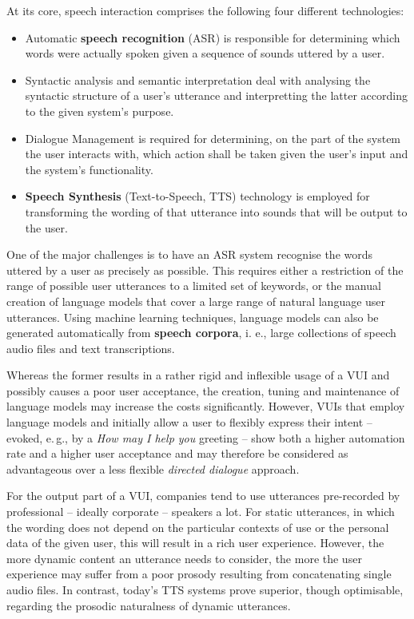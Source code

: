 \begin{multicols}{2}
At its core, speech interaction comprises the following four different technologies:

\begin{itemize}
\item Automatic \textbf{speech recognition} (ASR) is responsible for determining which words were actually spoken given a sequence of sounds uttered by a user.
\item Syntactic analysis and semantic interpretation deal with analysing the syntactic structure of a user’s utterance and interpretting the latter according to the given system’s purpose.
\item Dialogue Management is required for determining, on the part of the system the user interacts with, which action shall be taken given the user’s input and the system’s functionality.
\item \textbf{Speech Synthesis} (Text-to-Speech, TTS) technology is employed for transforming the wording of that utterance into sounds that will be output to the user. 
\end{itemize}

One of the major challenges is to have an ASR system recognise the words uttered by a user as precisely as possible. This requires either a restriction of the range of possible user utterances to a limited set of keywords, or the manual creation of language models that cover a large range of natural language user utterances. Using machine learning techniques, language models can also be generated automatically from \textbf{speech corpora}, i. e., large collections of speech audio files and text transcriptions.

Whereas the former results in a rather rigid and inflexible usage of a VUI and possibly causes a poor user acceptance, the creation, tuning and maintenance of language models may increase the costs significantly. However, VUIs that employ language models and initially allow a user to flexibly express their intent – evoked, e.\,g., by a \textit{How may I help you} greeting – show both a higher automation rate and a higher user acceptance and may therefore be considered as advantageous over a less flexible \textit{directed dialogue} approach.


For the output part of a VUI, companies tend to use utterances pre-recorded by professional – ideally corporate – speakers a lot. For static utterances, in which the wording does not depend on the particular contexts of use or the personal data of the given user, this will result in a rich user experience. However, the more dynamic content an utterance needs to consider, the more the user experience may suffer from a poor prosody resulting from concatenating single audio files. In contrast, today’s TTS systems prove superior, though optimisable, regarding the prosodic naturalness of dynamic utterances.  


\end{multicols}
